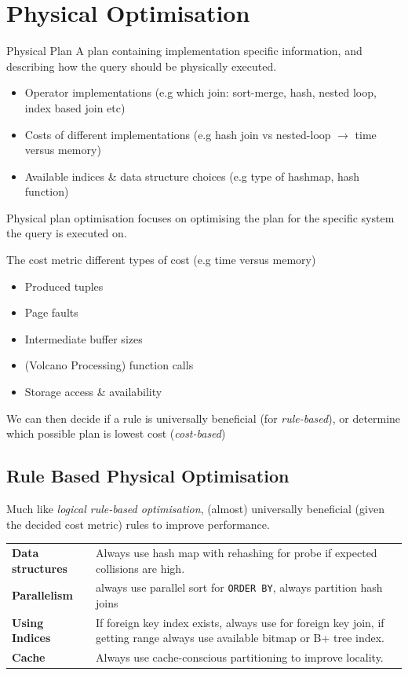 \section{Physical Optimisation}
\begin{definitionbox}{Physical Plan}
    A plan containing implementation specific information, and describing how the query should be physically executed.
    \begin{itemize}
        \item Operator implementations (e.g which join: sort-merge, hash, nested loop, index based join etc)
        \item Costs of different implementations (e.g hash join vs nested-loop $\to$ time versus memory)
        \item Available indices \& data structure choices (e.g type of hashmap, hash function)
    \end{itemize} 
    Physical plan optimisation focuses on optimising the plan for the specific system the query is executed on.
\end{definitionbox}

The cost metric different types of cost (e.g time versus memory)
\begin{itemize}
    \item Produced tuples
    \item Page faults
    \item Intermediate buffer sizes
    \item (Volcano Processing) function calls
    \item Storage access \& availability
\end{itemize}
We can then decide if a rule is universally beneficial (for \textit{rule-based}), or determine which possible plan is lowest cost (\textit{cost-based})

\subsection{Rule Based Physical Optimisation}
Much like \textit{logical rule-based optimisation}, (almost) universally beneficial (given the decided cost metric) rules to improve performance.
\begin{center}
    \begin{tabular}{l p{}}
        \textbf{Data structures} & Always use hash map with rehashing for probe if expected collisions are high.  \\
        \textbf{Parallelism}     & always use parallel sort for \texttt{ORDER BY}, always partition hash joins \\
        \textbf{Using Indices}   & If foreign key index exists, always use for foreign key join, if getting range always use available bitmap or B+ tree index. \\
        \textbf{Cache}           & Always use cache-conscious partitioning to improve locality. \\
    \end{tabular}
\end{center}

